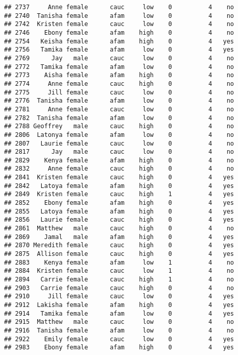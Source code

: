 \documentclass[
]{article}
\begin{document}
\begin{verbatim}
## 2737     Anne female      cauc     low    0          4    no
## 2740  Tanisha female      afam     low    0          4    no
## 2742  Kristen female      cauc     low    0          4    no
## 2746    Ebony female      afam    high    0          4    no
## 2754   Keisha female      afam    high    0          4   yes
## 2756   Tamika female      afam     low    0          4   yes
## 2769      Jay   male      cauc     low    0          4    no
## 2772   Tamika female      afam     low    0          4    no
## 2773    Aisha female      afam    high    0          4    no
## 2774     Anne female      cauc    high    0          4    no
## 2775     Jill female      cauc     low    0          4    no
## 2776  Tanisha female      afam     low    0          4    no
## 2781     Anne female      cauc     low    0          4    no
## 2782  Tanisha female      afam     low    0          4    no
## 2788 Geoffrey   male      cauc    high    0          4    no
## 2806  Latonya female      afam     low    0          4    no
## 2807   Laurie female      cauc     low    0          4    no
## 2817      Jay   male      cauc     low    0          4    no
## 2829    Kenya female      afam    high    0          4    no
## 2832     Anne female      cauc    high    0          4    no
## 2841  Kristen female      cauc    high    0          4   yes
## 2842   Latoya female      afam    high    0          4   yes
## 2849  Kristen female      cauc    high    1          4   yes
## 2852    Ebony female      afam    high    0          4   yes
## 2855   Latoya female      afam    high    0          4   yes
## 2856   Laurie female      cauc    high    0          4   yes
## 2861  Matthew   male      cauc    high    0          4    no
## 2869    Jamal   male      afam    high    0          4   yes
## 2870 Meredith female      cauc    high    0          4   yes
## 2875  Allison female      cauc    high    0          4   yes
## 2883    Kenya female      afam     low    1          4    no
## 2884  Kristen female      cauc     low    1          4    no
## 2894   Carrie female      cauc    high    1          4    no
## 2903   Carrie female      cauc    high    0          4    no
## 2910     Jill female      cauc     low    0          4   yes
## 2912  Lakisha female      afam    high    0          4   yes
## 2914   Tamika female      afam     low    0          4   yes
## 2915  Matthew   male      cauc     low    0          4    no
## 2916  Tanisha female      afam     low    0          4    no
## 2922    Emily female      cauc     low    0          4   yes
## 2983    Ebony female      afam    high    0          4   yes

\end{verbatim}
\end{document}

